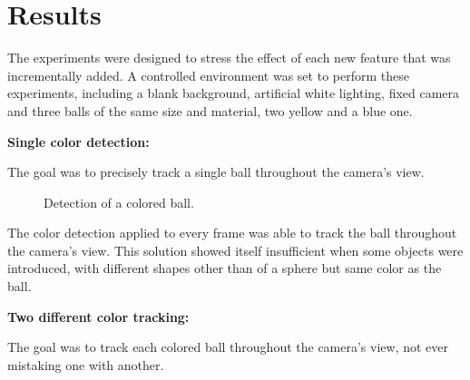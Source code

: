 \documentclass[10pt,twocolumn,letterpaper]{article}
\begin{document}
\section{Results}

  The experiments were designed to stress the effect of each new feature that
  was incrementally added. A controlled environment was set to perform these
  experiments, including a blank background, artificial white lighting, fixed
  camera and three balls of the same size and material, two yellow and a blue
  one.

  \bigbreak{}
  \textbf{Single color detection:}
  \bigbreak{}

  The goal was to precisely track a single ball throughout the camera's view.

  \begin{figure}[!h]
    \centering
    \setlength{\fboxsep}{1pt}
    \setlength{\fboxrule}{1pt}
    \caption{Detection of a colored ball.}\label{fig:single_color}
  \end{figure}

  The color detection applied to every frame was able to track the ball
  throughout the camera's view. This solution showed itself insufficient when
  some objects were introduced, with different shapes other than of a sphere but
  same color as the ball.

  \bigbreak{}
  \textbf{Two different color tracking:}
  \bigbreak{}

  The goal was to track each colored ball throughout the camera's view, not ever
  mistaking one with another.
\end{document}
